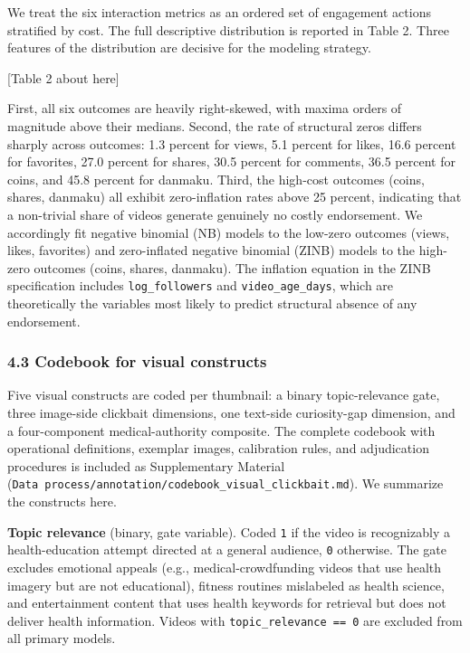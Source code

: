 \documentclass[
  12pt,
]{article}
\begin{document}
We treat the six interaction metrics as an ordered set of engagement
actions stratified by cost. The full descriptive distribution is
reported in Table 2. Three features of the distribution are decisive for
the modeling strategy.

{[}Table 2 about here{]}

First, all six outcomes are heavily right-skewed, with maxima orders of
magnitude above their medians. Second, the rate of structural zeros
differs sharply across outcomes: 1.3 percent for views, 5.1 percent for
likes, 16.6 percent for favorites, 27.0 percent for shares, 30.5 percent
for comments, 36.5 percent for coins, and 45.8 percent for danmaku.
Third, the high-cost outcomes (coins, shares, danmaku) all exhibit
zero-inflation rates above 25 percent, indicating that a non-trivial
share of videos generate genuinely no costly endorsement. We accordingly
fit negative binomial (NB) models to the low-zero outcomes (views,
likes, favorites) and zero-inflated negative binomial (ZINB) models to
the high-zero outcomes (coins, shares, danmaku). The inflation equation
in the ZINB specification includes \texttt{log\_followers} and
\texttt{video\_age\_days}, which are theoretically the variables most
likely to predict structural absence of any endorsement.

\subsubsection{4.3 Codebook for visual
constructs}\label{codebook-for-visual-constructs}

Five visual constructs are coded per thumbnail: a binary topic-relevance
gate, three image-side clickbait dimensions, one text-side curiosity-gap
dimension, and a four-component medical-authority composite. The
complete codebook with operational definitions, exemplar images,
calibration rules, and adjudication procedures is included as
Supplementary Material
(\texttt{Data\ process/annotation/codebook\_visual\_clickbait.md}). We
summarize the constructs here.

\textbf{Topic relevance} (binary, gate variable). Coded \texttt{1} if
the video is recognizably a health-education attempt directed at a
general audience, \texttt{0} otherwise. The gate excludes emotional
appeals (e.g., medical-crowdfunding videos that use health imagery but
are not educational), fitness routines mislabeled as health science, and
entertainment content that uses health keywords for retrieval but does
not deliver health information. Videos with
\texttt{topic\_relevance\ ==\ 0} are excluded from all primary models.
\end{document}
